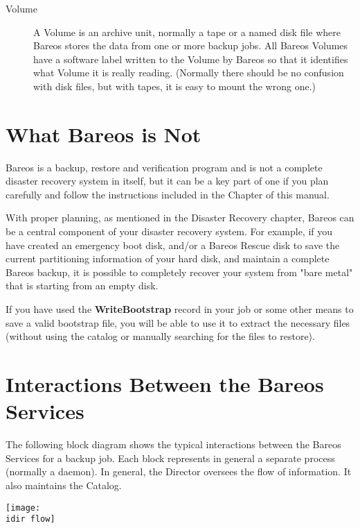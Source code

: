 \begin{description}
\item [Volume]
   A Volume is an archive unit, normally a tape or a named disk file where
   Bareos stores the data from one or more backup jobs.  All Bareos Volumes
   have a software label written to the Volume by Bareos so that it
   identifies what Volume it is really reading.  (Normally there should be
   no confusion with disk files, but with tapes, it is easy to mount the
   wrong one.)
\end{description}

\section{What Bareos is Not}

Bareos is a backup, restore and verification program and is not a
complete disaster recovery system in itself, but it can be a key part of one
if you plan carefully and follow the instructions included in the
 Chapter of this manual.

With proper planning, as mentioned in the Disaster Recovery chapter,
Bareos can be a central component of your disaster recovery system. For
example, if you have created an emergency boot disk, and/or a Bareos Rescue disk to
save the current partitioning information of your hard disk, and maintain a
complete Bareos backup, it is possible to completely recover your system from
"bare metal" that is starting from an empty disk.

If you have used the {\bf WriteBootstrap} record in your job or some other
means to save a valid bootstrap file, you will be able to use it to extract
the necessary files (without using the catalog or manually searching for the
files to restore).

\section{Interactions Between the Bareos Services}

The following block diagram shows the typical interactions between the Bareos
Services for a backup job. Each block represents in general a separate process
(normally a daemon). In general, the Director oversees the flow of
information. It also maintains the Catalog.

\texttt{[image: \\idir flow]}
